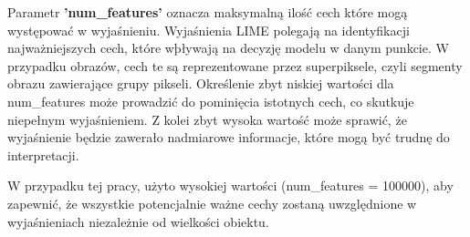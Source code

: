 Parametr \textbf{'num\_features'} oznacza maksymalną ilość cech które mogą występować w wyjaśnieniu.
Wyjaśnienia LIME polegają na identyfikacji najważniejszych cech, które wþływają na decyzję modelu w danym punkcie.
W przypadku obrazów, cech te są reprezentowane przez superpiksele, czyli segmenty obrazu zawierające grupy pikseli.
Określenie zbyt niskiej wartości dla num\_features może prowadzić do pominięcia istotnych cech, co skutkuje niepełnym wyjaśnieniem.
Z kolei zbyt wysoka wartość może sprawić, że wyjaśnienie będzie zawerało nadmiarowe informacje, które mogą być trudnę do interpretacji.

W przypadku tej pracy, użyto wysokiej wartości (num\_features = 100000), aby zapewnić, że wszystkie potencjalnie ważne cechy zostaną uwzględnione w wyjaśnieniach niezależnie od wielkości obiektu.

